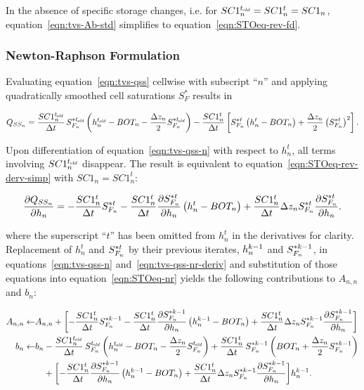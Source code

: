 \noindent In the absence of specific storage changes, i.e. for $SC1_n^{t_\mathit{\kern -0.07em old}} = SC1_n^t = SC1_n$, equation~\ref{eqn:tvs-Ab-std} simplifies to equation~\ref{eqn:STOeq-rev-fd}.


\subsubsection{Newton-Raphson Formulation}

Evaluating equation~\ref{eqn:tvs-qss} cellwise with subscript ``$n$'' and applying quadratically smoothed cell saturations $S_F^*$ results in

\begin{equation}
	\label{eqn:tvs-qss-n}
	Q_{SS_n} = \frac{SC1_n^{t_\mathit{\kern -0.07em old}}}{\Delta t} \, S_{F_n}^{\ast t_\mathit{\kern -0.07em old}} \left( h_n^{t_\mathit{\kern -0.07em old}} - BOT_n - \frac{\Delta z_n}{2} S_{F_n}^{\ast t_\mathit{\kern -0.07em old}} \right) - \frac{SC1_n^t}{\Delta t} \left[ S_{F_n}^{\ast t} \left( h_n^t - BOT_n \right) + \frac{\Delta z_n}{2} \left( S_{F_n}^{\ast t} \right)^2 \right] .
\end{equation}

\noindent Upon differentiation of equation~\ref{eqn:tvs-qss-n} with respect to $h_n^t$, all terms involving $SC1_n^{t_\mathit{\kern -0.07em old}}$ disappear. The result is equivalent to equation~\ref{eqn:STOeq-rev-derv-simp} with $SC1_n = SC1_n^t$:

\begin{equation}
	\label{eqn:tvs-qss-nr-deriv}
	\frac{\partial Q_{SS_n}}{\partial h_n} = -\frac{SC1_n^t}{\Delta t} S_{F_n}^{\ast t} - \frac{SC1_n^t}{\Delta t} \frac{\partial S_{F_n}^{\ast t}}{\partial h_n} \left( h_n^t - BOT_n \right) + \frac{SC1_n^t}{\Delta t} \Delta z_n S_{F_n}^{\ast t}  \frac{\partial S_{F_n}^{\ast t}}{\partial h_n} .
\end{equation}

\noindent where the superscript ``$t$'' has been omitted from $h_n^t$ in the derivatives for clarity. Replacement of $h_n^t$ and $S_{F_n}^{\ast t}$ by their previous iterates, $h_n^{k-1}$ and $S_{F_n}^{\ast k-1}$, in equations~\ref{eqn:tvs-qss-n} and~\ref{eqn:tvs-qss-nr-deriv} and substitution of those equations into equation~\ref{eqn:STOeq-nr} yields the following contributions to $A_{n,n}$ and $b_n$:

\begin{equation}
	\label{eqn:tvs-Ab-nr}
	\begin{aligned}
		A_{n,n} \leftarrow & A_{n,n} + \biggl[ - \frac{SC1_n^t}{\Delta t} S_{F_n}^{\ast k-1} - \frac{SC1_n^t}{\Delta t} \frac{\partial S_{F_n}^{\ast k-1}}{\partial h_n} \left( h_n^{k-1} - BOT_n \right) + \frac{SC1_n^t}{\Delta t} \Delta z_n S_{F_n}^{\ast k-1}  \frac{\partial S_{F_n}^{\ast k-1}}{\partial h_n} \biggr] \\
		b_n \leftarrow & b_n - \frac{SC1_n^{t_\mathit{\kern -0.07em old}}}{\Delta t} \, S_{F_n}^{t_\mathit{\kern -0.07em old}} \left( h_n^{t_\mathit{\kern -0.07em old}} - BOT_n - \frac{\Delta z_n}{2} S_{F_n}^{t_\mathit{\kern -0.07em old}} \right) + \frac{SC1_n^t}{\Delta t} \, S_{F_n}^{\ast k-1} \left( BOT_n + \frac{\Delta z_n}{2} S_{F_n}^{\ast k-1} \right) \\
		& \phantom{b_n} + \biggl[ - \frac{SC1_n^t}{\Delta t} \frac{\partial S_{F_n}^{\ast k-1}}{\partial h_n} \left( h_n^{k-1} - BOT_n \right) + \frac{SC1_n^t}{\Delta t} \Delta z_n S_{F_n}^{\ast k-1}  \frac{\partial S_{F_n}^{\ast k-1}}{\partial h_n} \biggr] h_n^{k-1} .
	\end{aligned}
\end{equation}

